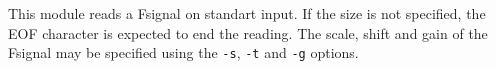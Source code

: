 This module reads a Fsignal on standart input. If the size is not
specified, the EOF character is expected to end the reading.
The scale, shift and gain of the Fsignal may be specified using the
\verb+-s+, \verb+-t+ and \verb+-g+ options.

